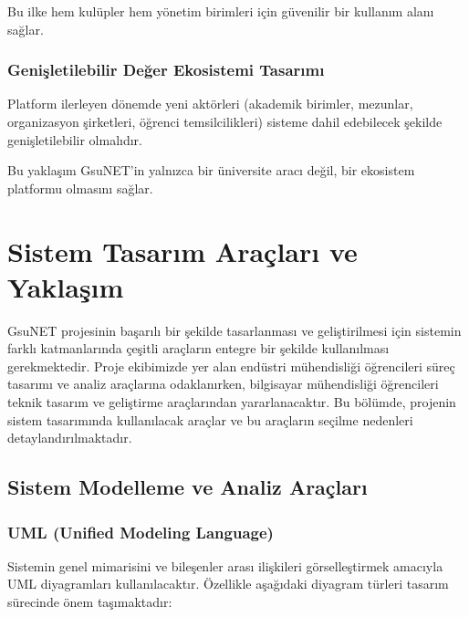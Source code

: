 \documentclass[a4paper,12pt]{report}
\begin{document}
Bu ilke hem kulüpler hem yönetim birimleri için güvenilir bir kullanım alanı sağlar.

\subsection{Genişletilebilir Değer Ekosistemi Tasarımı}

Platform ilerleyen dönemde yeni aktörleri (akademik birimler, mezunlar, organizasyon şirketleri, öğrenci temsilcilikleri) sisteme dahil edebilecek şekilde genişletilebilir olmalıdır.

Bu yaklaşım GsuNET’in yalnızca bir üniversite aracı değil, bir ekosistem platformu olmasını sağlar.

\chapter{Sistem Tasarım Araçları ve Yaklaşım}


GsuNET projesinin başarılı bir şekilde tasarlanması ve geliştirilmesi için sistemin farklı katmanlarında çeşitli araçların entegre bir şekilde kullanılması gerekmektedir. Proje ekibimizde yer alan endüstri mühendisliği öğrencileri süreç tasarımı ve analiz araçlarına odaklanırken, bilgisayar mühendisliği öğrencileri teknik tasarım ve geliştirme araçlarından yararlanacaktır. Bu bölümde, projenin sistem tasarımında kullanılacak araçlar ve bu araçların seçilme nedenleri detaylandırılmaktadır.

\section{Sistem Modelleme ve Analiz Araçları}

\subsection{UML (Unified Modeling Language)}

Sistemin genel mimarisini ve bileşenler arası ilişkileri görselleştirmek amacıyla UML diyagramları kullanılacaktır. Özellikle aşağıdaki diyagram türleri tasarım sürecinde önem taşımaktadır:
\end{document}
